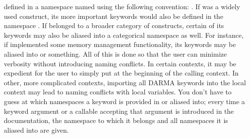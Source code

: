 defined in a namespace named using the following convention:
.
If  was a 
widely used construct, its more important keywords would also be defined in the namespace
.  If  belonged to a broader category of 
constructs, certain of its keywords may also be aliased into a categorical namespace
as well.  For instance, if  implemented some memory management functionality,
its keywords may be aliased into  or 
something.  All of this is done so that the user can minimize verbosity without introducing
naming conflicts.  In certain contexts, it may be expedient for the user to simply
put  at the beginning of the calling context.  In other,
more complicated contexts, importing all DARMA keywords into the local context may
lead to naming conflicts with local variables.  You don't have to guess at which namespaces
a keyword is provided in or aliased into; every time a keyword argument or a callable
accepting that argument is introduced in the documentation, the namespace to which 
it belongs and all namespaces it is aliased into are given.



